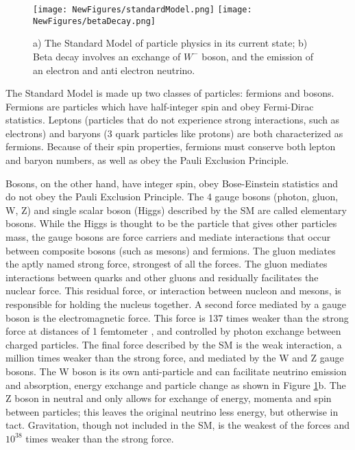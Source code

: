\documentclass[12pt]{article}
\begin{document}
\begin{figure}[h!]
\centering
\texttt{[image: NewFigures/standardModel.png]}
\hspace{6 mm}
\texttt{[image: NewFigures/betaDecay.png]}
\caption{a) The Standard Model of particle physics in its current state; b) Beta decay involves an exchange of $W^-$ boson, and the emission of an electron and anti electron neutrino. }
\label{fig:SM}
\end{figure}
\par The Standard Model is made up two classes of particles: fermions and bosons. Fermions are particles which have half-integer spin and obey Fermi-Dirac statistics. Leptons (particles that do not experience strong interactions, such as electrons) and baryons (3 quark particles like protons) are both characterized as fermions. Because of their spin properties, fermions must conserve both lepton and baryon numbers, as well as obey the Pauli Exclusion Principle. 
\par Bosons, on the other hand, have integer spin, obey Bose-Einstein statistics and do not obey the Pauli Exclusion Principle. The 4 gauge bosons (photon, gluon, W, Z) and single scalar boson (Higgs) described by the SM are called elementary bosons. While the Higgs is thought to be the particle that gives other particles mass, the gauge bosons are force carriers and mediate interactions that occur between composite bosons (such as mesons) and fermions.  The gluon mediates the aptly named strong force, strongest of all the forces. The gluon mediates interactions between quarks and other gluons and residually facilitates the nuclear force. This residual force, or interaction between nucleon and mesons, is responsible for holding the nucleus together. A second force mediated by a gauge boson is the electromagnetic force.  This force is 137 times weaker than the strong force at distances of 1 femtometer \cite{bib:forces}, and controlled by photon exchange between charged particles. The final force described by the SM is the weak interaction, a million times weaker than the strong force, and mediated by the W and Z gauge bosons.  The W boson is its own anti-particle and can facilitate neutrino emission and absorption, energy exchange and particle change as shown in Figure \ref{fig:SM}b. The Z boson in neutral and only allows for exchange of energy, momenta and spin between particles; this leaves the original neutrino less energy, but otherwise in tact. Gravitation, though not included in the SM, is the weakest of the forces and $10^{38}$ times weaker than the strong force.
\end{document}
